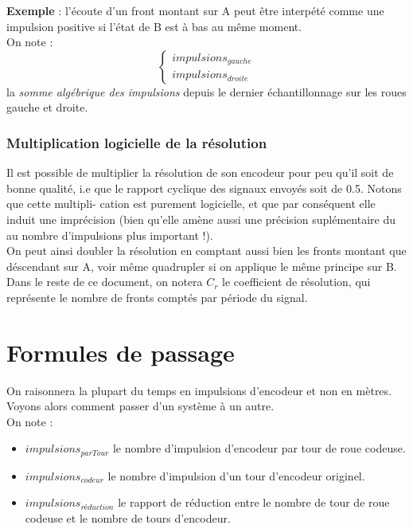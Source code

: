         \textbf{Exemple} : l’écoute d’un front montant sur A peut être interpété comme une impulsion positive si l’état de B est à bas au même moment.\\
        On note :
        $$
            \begin{cases}
                impulsions_{gauche}\\
                impulsions_{droite}
            \end{cases}
        $$
        la \textit{somme algébrique des impulsions} depuis le dernier échantillonnage sur les roues gauche et droite.

        \subsubsection{Multiplication logicielle de la résolution}
            Il est possible de multiplier la résolution de son encodeur pour peu qu’il soit de bonne qualité, i.e que le rapport cyclique des signaux envoyés soit de 0.5. Notons que cette multipli-
            cation est purement logicielle, et que par conséquent elle induit une imprécision (bien qu’elle amène aussi une précision suplémentaire du au nombre d’impulsions plus important !).\\
            On peut ainsi doubler la résolution en comptant aussi bien les fronts montant que déscendant sur A, voir même quadrupler si on applique le même principe sur B.\\
            Dans le reste de ce document, on notera $C_r$ le coefficient de résolution, qui représente le nombre de fronts comptés par période du signal.

    \newpage
    \section{Formules de passage}
        On raisonnera la plupart du temps en impulsions d’encodeur et non en mètres. Voyons alors comment passer d’un système à un autre.\\
        On note :
        \begin{itemize}
            \item $impulsions_{parTour}$ le nombre d’impulsion d’encodeur par tour de roue codeuse.
            \item $impulsions_{codeur}$ le nombre d’impulsion d’un tour d’encodeur originel.
            \item $impulsions_{réduction}$ le rapport de réduction entre le nombre de tour de roue codeuse et le nombre de tours d’encodeur.\\
        \end{itemize}

